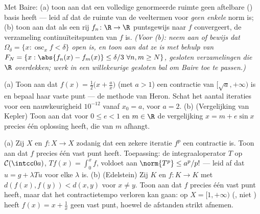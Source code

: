 \begin{exercise}[$\star$]\label{exo:b3:complete:2}
Met Baire: (a) toon aan dat een volledige genormeerde ruimte geen
aftelbare () basis heeft --- leid af dat de ruimte
van de veeltermen voor \emph{geen enkele} norm  is; (b)
toon aan dat als een rij  $f_n \colon \R \to \R$
puntsgewijs naar $f$ convergeert, de verzameling
continuïteitspunten van $f$  is. \emph{(Voor (b): neem aan
of bewijs dat $\Omega_\delta = \{x : \operatorname{osc}_x f <
\delta\}$ open is, en toon aan dat ze  is met behulp van
$F_{N} = \{x: \abs{f_n(x) - f_m(x)} \leq \delta/3\ \forall n,m
\geq N\}$, gesloten verzamelingen die $\R$ overdekken; werk in een
willekeurige gesloten bal om Baire toe te passen.)}
\end{exercise}

\begin{exercise}[$\star\star$]\label{exo:b3:complete:3}
(a) Toon aan dat $f(x) = \frac12\bigl(x + \frac ax\bigr)$ (met $a
> 1$) een contractie van $[\sqrt a, +\infty)$ is en bepaal haar
vaste punt --- de methode van Heron. Schat het aantal iteraties
voor een nauwkeurigheid $10^{-12}$ vanaf $x_0 = a$, voor $a = 2$.
(b) (Vergelijking van Kepler) Toon aan dat voor $0 \leq e < 1$ en
$m \in \R$ de vergelijking $x = m + e\sin x$ precies één
oplossing heeft, die  van $m$ afhangt.
\end{exercise}

\begin{exercise}[$\star\star$]\label{exo:b3:complete:4}
(a) Zij $X$  en $f \colon X \to X$ zodanig dat een zekere
iteratie $f^p$ een contractie is. Toon aan dat $f$ precies één
vast punt heeft. Toepassing: de integraaloperator $T$ op $\mathcal
C(\intcc0a)$, $Tf(x) = \int_0^x f$, voldoet aan $\norm{T^p} \leq
a^p/p!$ --- leid af dat $u = g + \lambda Tu$ voor elke $\lambda$
 is.
(b) (Edelstein) Zij $K$ \emph{} en $f\colon K \to K$ met
$d(f(x), f(y)) < d(x, y)$ voor $x \neq y$. Toon aan dat $f$
precies één vast punt heeft, maar dat het contractietempo verloren
kan gaan: op $X = [1, +\infty)$ (, niet ) heeft
$f(x) = x + \frac1x$ geen vast punt, hoewel de afstanden strikt
afnemen.
\end{exercise}

